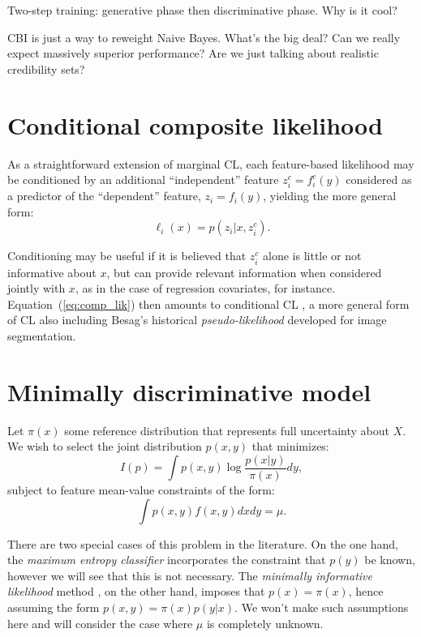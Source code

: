 \documentclass[english]{scrartcl}
\begin{document}
{\color{red}Two-step training: generative phase then discriminative phase. Why is it cool?}

{\color{red}CBI is just a way to reweight Naive Bayes. What's the big deal? Can we really expect massively superior performance? Are we just talking about realistic credibility sets?}


\appendix

\section{Conditional composite likelihood}
\label{sec:conditional}

As a straightforward  extension of marginal CL, each feature-based likelihood may be conditioned by an additional ``independent'' feature $z^c_i = f^c_i(y)$ considered as a predictor of the ``dependent'' feature, $z_i=f_i(y)$, yielding the more general form:
\begin{equation}
\label{eq:cond_feat_lik}
\ell_i(x) = p(z_i|x,z^c_i).
\end{equation}

Conditioning may be useful if it is believed that $z^c_i$ alone is little or not informative about $x$, but can provide relevant information when considered jointly with $x$, as in the case of regression covariates, for instance. Equation~(\ref{eq:comp_lik}) then amounts to conditional CL \cite{Varin-11}, a more general form of CL also including Besag's historical {\em pseudo-likelihood} \cite{Besag-74} developed for image segmentation.


\section{Minimally discriminative model}

Let $\pi(x)$ some reference distribution that represents full
uncertainty about $X$. We wish to select the joint distribution
$p(x,y)$ that minimizes:
$$
I(p) = \int p(x,y) \log \frac{p(x|y)}{\pi(x)} dy,
$$ subject to feature mean-value constraints of the form:
$$
\int p(x,y) f(x,y) dx dy = \mu.
$$

There are two special cases of this problem in the literature.  On the
one hand, the {\em maximum entropy classifier} \cite{BergerA-96}
incorporates the constraint that $p(y)$ be known, however we will see
that this is not necessary. The {\em minimally informative likelihood}
method \cite{Yuan-99b,Yuan-99}, on the other hand, imposes that
$p(x)=\pi(x)$, hence assuming the form $p(x,y)=\pi(x)p(y|x)$. We won't
make such assumptions here and will consider the case where $\mu$ is
completely unknown.
\end{document}

